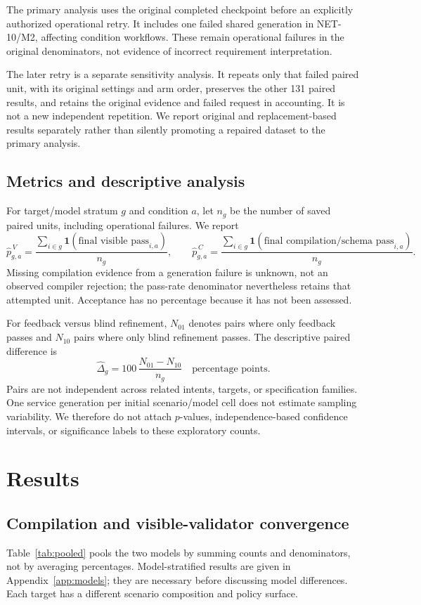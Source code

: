 \documentclass[11pt]{article}
\begin{document}
The primary analysis uses the original completed checkpoint before an explicitly
authorized operational retry. It includes one failed shared generation in
NET-10/M2, affecting \PrimaryOperationalWorkflows{} condition workflows.
These remain operational failures in the original denominators, not evidence of
incorrect requirement interpretation.

The later retry is a separate sensitivity analysis. It repeats only that failed
paired unit, with its original settings and arm order, preserves the other 131
paired results, and retains the original evidence and failed request in accounting.
It is not a new independent repetition. We report original and replacement-based
results separately rather than silently promoting a repaired dataset to the
primary analysis.

\subsection{Metrics and descriptive analysis}
For target/model stratum $g$ and condition $a$, let $n_g$ be the number of saved
paired units, including operational failures. We report
\[
 \widehat p_{g,a}^{\,V}
 = \frac{\sum_{i\in g}\mathbf{1}(\text{final visible pass}_{i,a})}{n_g},
 \qquad
 \widehat p_{g,a}^{\,C}
 = \frac{\sum_{i\in g}\mathbf{1}(\text{final compilation/schema pass}_{i,a})}{n_g}.
\]
Missing compilation evidence from a generation failure is unknown, not an
observed compiler rejection; the pass-rate denominator nevertheless retains
that attempted unit. Acceptance has no percentage because it has not been assessed.

For feedback versus blind refinement, $N_{01}$ denotes pairs where only feedback
passes and $N_{10}$ pairs where only blind refinement passes. The descriptive
paired difference is
\[
 \widehat\Delta_g = 100\,\frac{N_{01}-N_{10}}{n_g}
 \quad\text{percentage points}.
\]
Pairs are not independent across related intents, targets, or specification
families. One service generation per initial scenario/model cell does not estimate
sampling variability. We therefore do not attach $p$-values, independence-based
confidence intervals, or significance labels to these exploratory counts.

\section{Results}
\subsection{Compilation and visible-validator convergence}
Table~\ref{tab:pooled} pools the two models by summing counts and denominators,
not by averaging percentages. Model-stratified results are given in
Appendix~\ref{app:models}; they are necessary before discussing model differences.
Each target has a different scenario composition and policy surface.
\end{document}
